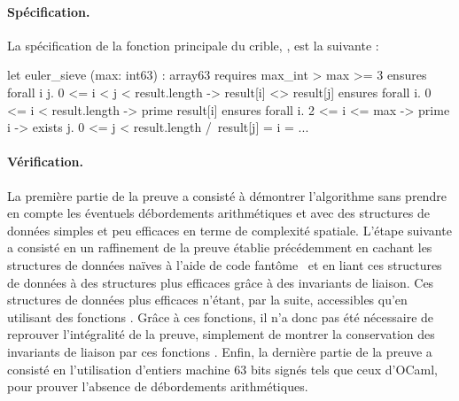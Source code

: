 \documentclass[a4paper]{easychair}
\begin{document}
\paragraph{Spécification.}
La spécification de la fonction principale du crible,
, est la suivante :

\begin{why3}
let euler_sieve (max: int63) : array63
    requires { max_int > max >= 3 }
    ensures  { forall i j. 0 <= i < j < result.length -> result[i] <> result[j] }
    ensures  { forall i. 0 <= i < result.length -> prime result[i] }
    ensures  { forall i. 2 <= i <= max -> prime i ->
                         exists j. 0 <= j < result.length /\ result[j] = i }
= ...
\end{why3}






\paragraph{Vérification.}

La première partie de la preuve a consisté à démontrer l'algorithme sans prendre
en compte les éventuels débordements arithmétiques et avec des structures
de données simples et peu efficaces en terme de complexité spatiale.
L'étape suivante a consisté en un raffinement de la preuve établie précédemment
en cachant les structures de données naïves à l'aide de code
fantôme~\cite{ghost-code} et en liant ces structures de données à des structures
plus efficaces grâce à des invariants de liaison. Ces structures de données plus
efficaces n'étant, par la suite, accessibles qu'en utilisant des fonctions
. Grâce à ces fonctions, il n'a donc pas été
nécessaire de reprouver l'intégralité de la preuve, simplement de montrer la
conservation des invariants de liaison par ces fonctions .
Enfin, la dernière partie de la preuve a consisté en l'utilisation d'entiers
machine 63 bits signés tels que ceux d'OCaml, pour prouver l'absence de
débordements arithmétiques.
\end{document}
